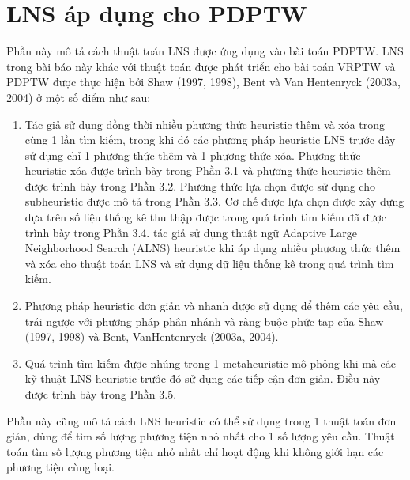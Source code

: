 
\chapter{LNS áp dụng cho PDPTW}
Phần này mô tả cách thuật toán LNS được ứng dụng vào bài toán PDPTW. LNS trong bài báo này khác với thuật toán được phát triển cho bài toán VRPTW và PDPTW được thực hiện bởi Shaw (1997, 1998), Bent và Van Hentenryck (2003a, 2004) ở một số điểm như sau:
\begin{enumerate}
    \item Tác giả sử dụng đồng thời nhiều phương thức heuristic thêm và xóa trong cùng 1 lần tìm kiếm, trong khi đó các phương pháp heuristic LNS trước đây sử dụng chỉ 1 phương thức thêm và 1 phương thức xóa. Phương thức heuristic xóa được trình bày trong Phần 3.1 và phương thức heuristic thêm được trình bày trong Phần 3.2. Phương thức lựa chọn được sử dụng cho subheuristic được mô tả trong Phần 3.3. Cơ chế được lựa chọn được xây dựng dựa trên số liệu thống kê thu thập được trong quá trình tìm kiếm đã được trình bày trong Phần 3.4. tác giả sử dụng thuật ngữ Adaptive Large Neighborhood Search (ALNS) heuristic khi áp dụng nhiều phương thức thêm và xóa cho thuật toán LNS và sử dụng dữ liệu thống kê trong quá trình tìm kiếm.
    \item Phương pháp heuristic đơn giản và nhanh được sử dụng để thêm các yêu cầu, trái ngược với phương pháp phân nhánh và ràng buộc phức tạp của Shaw (1997, 1998) và Bent, VanHentenryck (2003a, 2004).
    \item Quá trình tìm kiếm được nhúng trong 1 metaheuristic mô phỏng khi mà các kỹ thuật LNS heuristic trước đó sử dụng các tiếp cận đơn giản. Điều này được trình bày trong Phần 3.5.
\end{enumerate}
Phần này cũng mô tả cách LNS heuristic có thể sử dụng trong 1 thuật toán đơn giản, dùng để tìm số lượng phương tiện nhỏ nhất cho 1 số lượng yêu cầu. Thuật toán tìm số lượng phương tiện nhỏ nhất chỉ hoạt động khi không giới hạn các phương tiện cùng loại.









